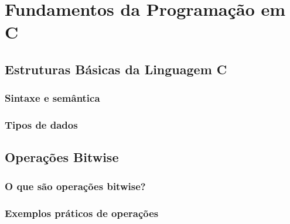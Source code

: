 \section{Fundamentos da Programação em C}

\subsection{Estruturas Básicas da Linguagem C}
\subsubsection{Sintaxe e semântica}
\subsubsection{Tipos de dados}

\subsection{Operações Bitwise}
\subsubsection{O que são operações bitwise?}
\subsubsection{Exemplos práticos de operações}